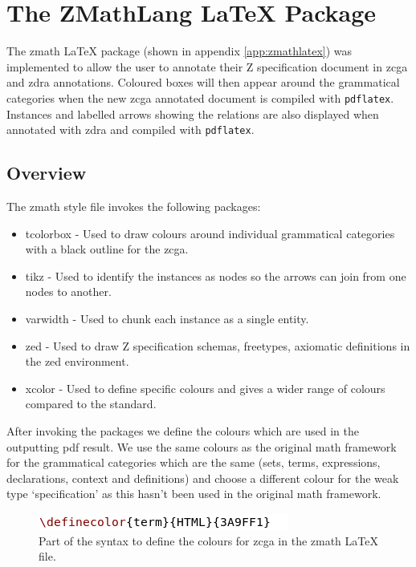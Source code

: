 \section{The ZMathLang LaTeX Package}

The \gls{zmath} \LaTeX{} package (shown in appendix \ref{app:zmathlatex}) was implemented to allow the user to annotate their Z specification document in \gls{zcga} and \gls{zdra} annotations. Coloured boxes will then appear around the grammatical categories when the new \gls{zcga} annotated document is compiled with \texttt{pdflatex}. Instances and labelled arrows showing the relations are also displayed when annotated with \gls{zdra} and compiled with \texttt{pdflatex}. 

\subsection{Overview}

The \gls{zmath} style file invokes the following packages:

\begin{itemize}
\item tcolorbox - Used to draw colours around individual grammatical categories with a black outline for the \gls{zcga}.
\item tikz - Used to identify the instances as nodes so the arrows can join from one nodes to another.
\item varwidth - Used to chunk each instance as a single entity.
\item zed - Used to draw Z specification schemas, freetypes, axiomatic definitions in the zed environment.
\item xcolor - Used to define specific colours and gives a wider range of colours compared to the standard.
\end{itemize}

After invoking the packages we define the colours which are used in the outputting pdf result. We use the same colours as the original \gls{math} framework for the grammatical categories which are the same (sets, terms, expressions, declarations, context and definitions) and choose a different colour for the weak type `specification' as this hasn't been used in the original \gls{math} framework.

\begin{figure}[H]
\includegraphics[scale=0.7]{Figures/Design/zmatha.png}
\caption{Part of the syntax to define the colours for \gls{zcga} in the \gls{zmath} \LaTeX{} file. \label{fig:definecolourlatex}}
\end{figure}

